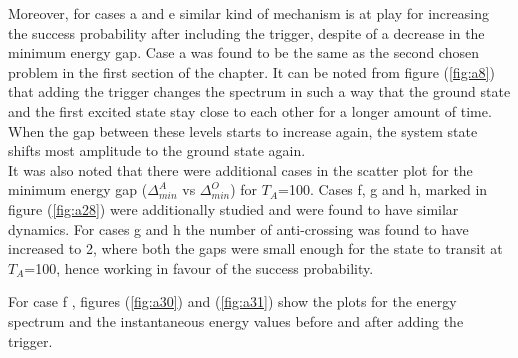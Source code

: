 \documentclass[../main.tex]{subfiles}
\begin{document}
Moreover, for cases a and e similar kind of mechanism is at play for increasing the success probability after including the trigger, despite of a decrease in the minimum energy gap. Case a was found to be the same as the second chosen problem in the first section of the chapter. It can be noted from figure (\ref{fig:a8}) that adding the trigger changes the spectrum in such a way that the ground state and the first excited state stay close to each other for a longer amount of time. When the gap between these levels starts to increase again, the system state shifts most amplitude to the ground state again.\\

It was also noted that there were additional cases in the scatter plot for the minimum energy gap ($\Delta_{min}^A$ vs $\Delta_{min}^O$) for $T_A$=100. Cases f, g and h, marked in figure (\ref{fig:a28}) were additionally studied and were found to have similar dynamics. For cases g and h the number of anti-crossing was found to have increased to 2, where both the gaps were small enough for the state to transit at $T_A$=100, hence working in favour of the success probability. 

For case f , figures (\ref{fig:a30}) and (\ref{fig:a31}) show the plots for the energy spectrum and the instantaneous energy values before and after adding the trigger.
\end{document}
